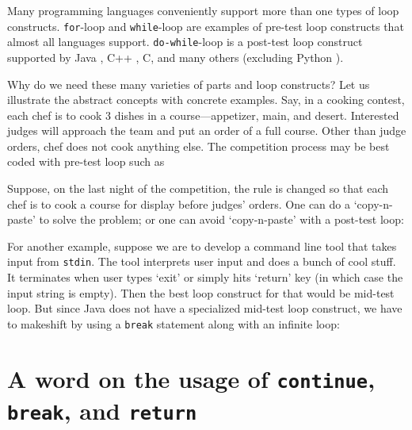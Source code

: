 \documentclass[oneside,11pt]{book}
\theoremstyle{definition}
\theoremstyle{remark}
\newcommand{\code}[1]{\mbox{\lstinline{#1}}}
\newcommand{\java}{Java }
\newcommand{\python}{Python }
\newcommand{\cpp}{C++ }
\begin{document}
Many programming languages conveniently support more than one types of loop constructs.
\code{for}-loop and \code{while}-loop are examples of pre-test loop constructs that
almost all languages support.
\code{do-while}-loop is a post-test loop construct supported by \java, \cpp, C, and many
others (excluding \python).


Why do we need these many varieties of parts and loop constructs?
Let us illustrate the abstract concepts with concrete examples.
Say, in a cooking contest, each chef is to cook 3 dishes in a course---appetizer, main,
and desert.
Interested judges will approach the team and put an order of a full course.
Other than judge orders, chef does not cook anything else.
The competition process may be best coded with pre-test loop such as



Suppose, on the last night of the competition, the rule is changed so that each chef is to cook a
course for display before judges' orders.
One can do a `copy-n-paste' to solve the problem;
or one can avoid `copy-n-paste' with a post-test loop:



For another example, suppose we are to develop a command line tool that takes input from
\code{stdin}.
The tool interprets user input and does a bunch of cool stuff.
It terminates when user types `exit' or simply hits `return' key
(in which case the input string is empty).
Then the best loop construct for that would be mid-test loop.
But since \java does not have a specialized mid-test loop construct, we have to makeshift by using
a \code{break} statement along with an infinite loop:



\section{A word on the usage of \code{continue}, \code{break}, and \code{return}}
\label{sec:continue-and-break}
\end{document}
